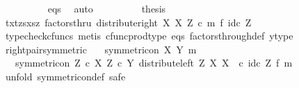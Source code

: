 \begin{isabellebody}
\ \ \ \ \ \ \ \ \isamarkupfalse%
\ eqs\ \isamarkupfalse%
\ auto\isanewline
\ \ \ \ \ \ \isamarkupfalse%
\ \isamarkupfalse%
\ {\isacharquery}{\kern0pt}thesis\isacommand{{\isachardot}{\kern0pt}}\isamarkupfalse%
\isanewline
\ \ \ \ \isamarkupfalse%
\isanewline
\ \ \ \ \isamarkupfalse%
\ \isamarkupfalse%
\ {\isachardoublequoteopen}{\isasymlangle}{\isasymlangle}tx{\isacharcomma}{\kern0pt}tz{\isasymrangle}{\isacharcomma}{\kern0pt}{\isasymlangle}sx{\isacharcomma}{\kern0pt}sz{\isasymrangle}{\isasymrangle}\ factorsthru\ {\isacharparenleft}{\kern0pt}distribute{\isacharunderscore}{\kern0pt}right\ X\ X\ Z\ {\isasymcirc}\isactrlsub c\ m\ {\isasymtimes}\isactrlsub f\ id\isactrlsub c\ Z{\isacharparenright}{\kern0pt}{\isachardoublequoteclose}\isanewline
\ \ \ \ \ \ \isamarkupfalse%
\ {\isacharparenleft}{\kern0pt}typecheck{\isacharunderscore}{\kern0pt}cfuncs{\isacharcomma}{\kern0pt}\ metis\ cfunc{\isacharunderscore}{\kern0pt}prod{\isacharunderscore}{\kern0pt}type\ eqs\ factors{\isacharunderscore}{\kern0pt}through{\isacharunderscore}{\kern0pt}def{}\ y{\isacharprime}{\kern0pt}{\isacharunderscore}{\kern0pt}type{\isacharparenright}{\kern0pt}\isanewline
\ \ \isamarkupfalse%
\isanewline
{}\isamarkupfalse%
%
\endisatagproof
{\isafoldproof}%
%
\isadelimproof
\isanewline
%
\endisadelimproof
\isanewline
{}\isamarkupfalse%
\ right{\isacharunderscore}{\kern0pt}pair{\isacharunderscore}{\kern0pt}symmetric{\isacharcolon}{\kern0pt}\isanewline
\ \ \ {\isachardoublequoteopen}symmetric{\isacharunderscore}{\kern0pt}on\ X\ {\isacharparenleft}{\kern0pt}Y{\isacharcomma}{\kern0pt}\ m{\isacharparenright}{\kern0pt}{\isachardoublequoteclose}\isanewline
\ \ \ {\isachardoublequoteopen}symmetric{\isacharunderscore}{\kern0pt}on\ {\isacharparenleft}{\kern0pt}Z\ {\isasymtimes}\isactrlsub c\ X{\isacharparenright}{\kern0pt}\ {\isacharparenleft}{\kern0pt}Z\ {\isasymtimes}\isactrlsub c\ Y{\isacharcomma}{\kern0pt}\ distribute{\isacharunderscore}{\kern0pt}left\ Z\ X\ X\ \ {\isasymcirc}\isactrlsub c\ {\isacharparenleft}{\kern0pt}id\isactrlsub c\ Z\ {\isasymtimes}\isactrlsub f\ m{\isacharparenright}{\kern0pt}{\isacharparenright}{\kern0pt}{\isachardoublequoteclose}\isanewline
%
\isadelimproof
%
\endisadelimproof
%
\isatagproof
{}\isamarkupfalse%
\ {\isacharparenleft}{\kern0pt}unfold\ symmetric{\isacharunderscore}{\kern0pt}on{\isacharunderscore}{\kern0pt}def{\isacharcomma}{\kern0pt}\ safe{\isacharparenright}{\kern0pt}\isanewline

\end{isabellebody}
